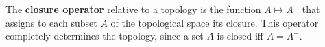 The \textbf{closure operator} relative to a topology is the function $A \mapsto A^{-}$ that assigns to each subset $A$ of the topological space its closure. This operator completely determines the topology, since a set $A$ is closed iff $A = A^{-}$.
